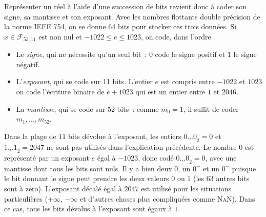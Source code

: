 \documentclass{magnolia}
\begin{document}
\begin{remarques}
  \remarque Représenter un réel à l'aide d'une succession de bits revient donc à coder son signe, sa
    mantisse et son exposant. Avec les nombres flottants double précision de la norme \textsc{IEEE 754},
    on se donne 64 bits pour stocker ces trois données. Si $x\in\mathcal{F}_{53,11}$ est non nul
    et $-1022\leq e\leq 1023$, on code, dans l'ordre
  \begin{itemize}
  \item Le \emph{signe}, qui ne nécessite qu'un seul bit~: $0$ code le signe positif et $1$ le signe négatif.
  \item L'\emph{exposant}, qui se code sur 11 bits. L'entier $e$ est compris entre $-1022$
    et $1023$ on code l'écriture binaire de $e+1023$ qui est un entier entre
    $1$ et $2046$.
  \item La \emph{mantisse}, qui se code sur 52 bits~: comme $m_0=1$, il suffit de
    coder $m_1,\ldots,m_{52}$.
  \end{itemize}
  \remarque Dans la plage de $11$ bits dévolue à l'exposant, les entiers
    $\underline{0\ldots0}_2=0$ et $\underline{1\ldots 1}_2=2047$  ne sont pas utilisés
    dans l'explication précédente. Le nombre 0 est représenté par un exposant $e$ égal à $-1023$, donc codé
    $\underline{0\ldots0}_2=0$, avec une mantisse dont tous les bits sont nuls. Il y a bien deux $0$, un $0^+$ et un $0^-$ puisque le bit donnant
    le signe peut prendre les deux valeurs $0$ ou $1$ (les $63$ autres bits sont à zéro).
     L'exposant décalé égal à $2047$ est utilisé pour les situations particulières
     ($+\infty$, $-\infty$ et d'autres choses plus compliquées comme \textsc{NaN}). Dans ce cas, tous les bits dévolus à l'exposant sont 
     égaux à $1$.
  \end{remarques}
\end{document}
